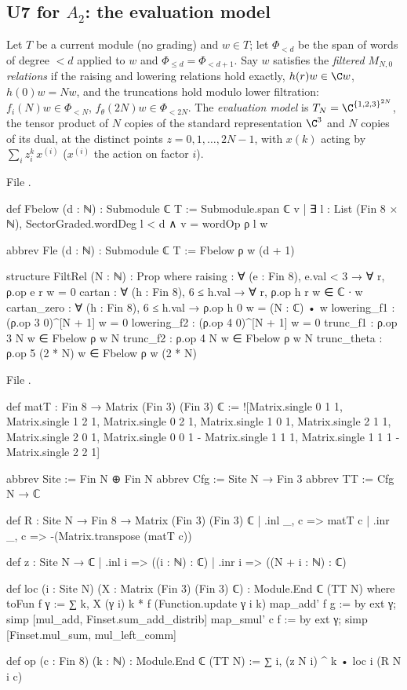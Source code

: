 \subsection{U7 for $A_2$: the evaluation model}

\begin{definition}\label{l26:def:evalmodel}
Let $T$ be a current module (no grading) and $w\in T$; let $\Phi_{<d}$ be the span of words of degree $<d$ applied to $w$
and $\Phi_{\le d}=\Phi_{<d+1}$. Say $w$ satisfies the \emph{filtered $M_{N,0}$ relations} if the raising and lowering
relations hold exactly, $h(r)w\in\C w$, $h(0)w=Nw$, and the truncations hold modulo lower filtration:
$f_i(N)w\in\Phi_{<N}$, $f_\theta(2N)w\in\Phi_{<2N}$. The \emph{evaluation model} is $T_N=\C^{\{1,2,3\}^{2N}}$, the tensor
product of $N$ copies of the standard representation $\C^3$ and $N$ copies of its dual, at the distinct points
$z=0,1,\dots,2N-1$, with $x(k)$ acting by $\sum_iz_i^k\,x^{(i)}$ ($x^{(i)}$ the action on factor $i$).
\end{definition}
\noindent File .
\begin{leancode}
def Fbelow (d : ℕ) : Submodule ℂ T :=
  Submodule.span ℂ {v | ∃ l : List (Fin 8 × ℕ), SectorGraded.wordDeg l < d ∧ v = wordOp ρ l w}

abbrev Fle (d : ℕ) : Submodule ℂ T := Fbelow ρ w (d + 1)

structure FiltRel (N : ℕ) : Prop where
  raising : ∀ (e : Fin 8), e.val < 3 → ∀ r, ρ.op e r w = 0
  cartan : ∀ (h : Fin 8), 6 ≤ h.val → ∀ r, ρ.op h r w ∈ ℂ ∙ w
  cartan_zero : ∀ (h : Fin 8), 6 ≤ h.val → ρ.op h 0 w = (N : ℂ) • w
  lowering_f1 : (ρ.op 3 0)^[N + 1] w = 0
  lowering_f2 : (ρ.op 4 0)^[N + 1] w = 0
  trunc_f1 : ρ.op 3 N w ∈ Fbelow ρ w N
  trunc_f2 : ρ.op 4 N w ∈ Fbelow ρ w N
  trunc_theta : ρ.op 5 (2 * N) w ∈ Fbelow ρ w (2 * N)
\end{leancode}
\noindent File .
\begin{leancode}
def matT : Fin 8 → Matrix (Fin 3) (Fin 3) ℂ :=
  ![Matrix.single 0 1 1, Matrix.single 1 2 1, Matrix.single 0 2 1, Matrix.single 1 0 1,
    Matrix.single 2 1 1, Matrix.single 2 0 1, Matrix.single 0 0 1 - Matrix.single 1 1 1,
    Matrix.single 1 1 1 - Matrix.single 2 2 1]

abbrev Site := Fin N ⊕ Fin N
abbrev Cfg := Site N → Fin 3
abbrev TT := Cfg N → ℂ

def R : Site N → Fin 8 → Matrix (Fin 3) (Fin 3) ℂ
  | .inl _, c => matT c
  | .inr _, c => -(Matrix.transpose (matT c))

def z : Site N → ℂ
  | .inl i => ((i : ℕ) : ℂ)
  | .inr i => ((N + i : ℕ) : ℂ)

def loc (i : Site N) (X : Matrix (Fin 3) (Fin 3) ℂ) : Module.End ℂ (TT N) where
  toFun f γ := ∑ k, X (γ i) k * f (Function.update γ i k)
  map_add' f g := by ext γ; simp [mul_add, Finset.sum_add_distrib]
  map_smul' c f := by ext γ; simp [Finset.mul_sum, mul_left_comm]

def op (c : Fin 8) (k : ℕ) : Module.End ℂ (TT N) := ∑ i, (z N i) ^ k • loc i (R N i c)
\end{leancode}

